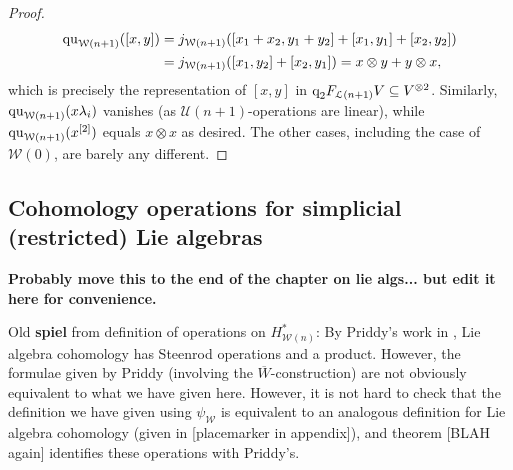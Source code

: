 \documentclass[11pt]{amsart}
\theoremstyle{plain}
\theoremstyle{definition}
\newcommand{\calU}{\mathcal{U}}
\newcommand{\calL}{\mathcal{L}}
\newcommand{\calw}{\mathcal{W}}
\theoremstyle{plain}
\newcommand{\restn}[1]{#1^{[2]}}
\newcommand{\quadratic}{\textup{qu}}
\newcommand{\quadgrad}[1]{\textup{q}_{#1}}
\begin{document}
\begin{homotopy operations for PRLs}
\begin{proof}
\begin{alignat*}{2}
\quadratic_{\calw(n+1)}([x,y])&=j_{\calw(n+1)}([{x_1}+{{x_2}},{y_1}+{{y_2}}]+[{x_1},{y_1}]+[{{x_2}},{{y_2}}])\\
&=j_{\calw(n+1)}([{x_1},{{y_2}}]+[{{x_2}},{y_1}])=x\otimes y+y\otimes x,
\end{alignat*}
which is precisely the representation of $[x,y]$ in $\quadgrad{2}F_{\calL(n+1)}V\subseteq V^{\otimes2}$. Similarly, $\quadratic_{\calw(n+1)}(x\lambda_i)$ vanishes (as $\calU(n+1)$-operations are linear), while $\quadratic_{\calw(n+1)}(\restn{x})$ equals $x\otimes x$ as desired. The other cases, including the case of $\calw(0)$, are barely any different.
\end{proof}

\subsection{Cohomology operations for simplicial (restricted) Lie algebras}\label{section: Cohomology operations for simplicial (restricted) Lie algebras}

\textbf{Probably move this to the end of the chapter on lie algs... but edit it here for convenience.}

Old \textbf{spiel} from definition of operations on $H^*_{\calw(n)}$:
By Priddy's work in \cite{PriddySimplicialLie.pdf}, Lie algebra cohomology has Steenrod operations and a product. However, the formulae given by Priddy (involving the $\overline{W}$-construction) are not obviously equivalent to what we have given here. However, it is not hard to check that the definition we have given using $\psi_\calw$ is equivalent to an analogous definition for Lie algebra cohomology (given in [placemarker in appendix]), and theorem [BLAH again] identifies these operations with Priddy's.


\end{homotopy operations for PRLs}
\end{document}
